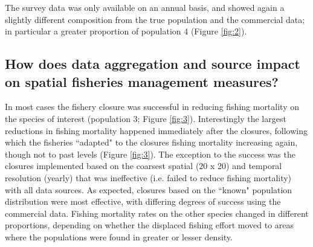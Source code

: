 \documentclass[review]{elsarticle}
\begin{document}
The survey data was only available on an annual basis, and showed again a
slightly different composition from the true population and the commercial
data; in particular a greater proportion of population 4 (Figure \ref{fig:2}).

\subsection{How does data aggregation and source impact on spatial fisheries
	management measures?}


In most cases the fishery closure was successful in reducing fishing mortality
on the species of interest (population 3; Figure \ref{fig:3}). Interestingly
the largest reductions in fishing mortality happened immediately after the
closures, following which the fisheries ``adapted" to the closures  fishing
mortality increasing again, though not to past levels (Figure \ref{fig:3}).
The exception to the success was the closures implemented based on the coarsest
spatial (20 x 20) and temporal resolution (yearly) that was ineffective (i.e.
failed to reduce fishing mortality) with all data sources. As expected,
closures based on the ``known" population distribution were most effective,
with differing degrees of success using the commercial data. Fishing mortality
rates on the other species changed in different proportions, depending on
whether the displaced fishing effort moved to areas where the populations were
found in greater or lesser density. \\
\end{document}
